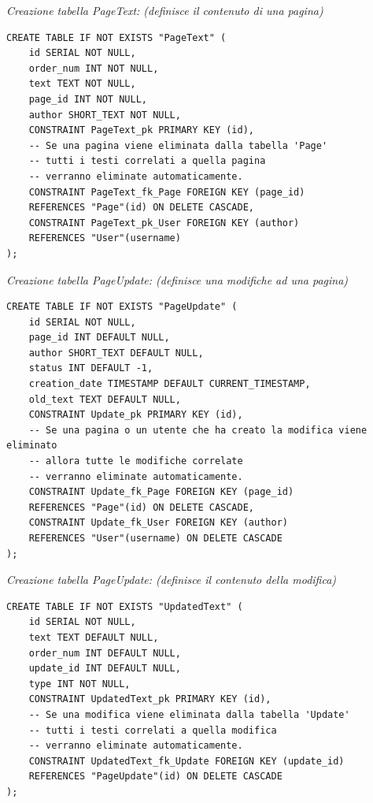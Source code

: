\documentclass{article}
\begin{document}
	\newpage
	
	\textit{Creazione tabella PageText: (definisce il contenuto di una pagina)}
	\begin{lstlisting}[style=SQL]
CREATE TABLE IF NOT EXISTS "PageText" (
	id SERIAL NOT NULL,
	order_num INT NOT NULL,
	text TEXT NOT NULL,
	page_id INT NOT NULL,
	author SHORT_TEXT NOT NULL,
	CONSTRAINT PageText_pk PRIMARY KEY (id),
   	-- Se una pagina viene eliminata dalla tabella 'Page'
   	-- tutti i testi correlati a quella pagina
   	-- verranno eliminate automaticamente.	
	CONSTRAINT PageText_fk_Page FOREIGN KEY (page_id) 
	REFERENCES "Page"(id) ON DELETE CASCADE,
	CONSTRAINT PageText_pk_User FOREIGN KEY (author)
	REFERENCES "User"(username)
);
	\end{lstlisting}
	
	
	\textit{Creazione tabella PageUpdate: (definisce una modifiche ad una pagina)}
	\begin{lstlisting}[style=SQL]
CREATE TABLE IF NOT EXISTS "PageUpdate" (
	id SERIAL NOT NULL,
	page_id INT DEFAULT NULL,
	author SHORT_TEXT DEFAULT NULL,
	status INT DEFAULT -1,
	creation_date TIMESTAMP DEFAULT CURRENT_TIMESTAMP,
	old_text TEXT DEFAULT NULL,
	CONSTRAINT Update_pk PRIMARY KEY (id),
	-- Se una pagina o un utente che ha creato la modifica viene eliminato
	-- allora tutte le modifiche correlate
	-- verranno eliminate automaticamente.	
	CONSTRAINT Update_fk_Page FOREIGN KEY (page_id)
	REFERENCES "Page"(id) ON DELETE CASCADE,
	CONSTRAINT Update_fk_User FOREIGN KEY (author)
	REFERENCES "User"(username) ON DELETE CASCADE
);
	\end{lstlisting}
	
	
	\textit{Creazione tabella PageUpdate: (definisce il contenuto della modifica)}
	\begin{lstlisting}[style=SQL]
CREATE TABLE IF NOT EXISTS "UpdatedText" (
	id SERIAL NOT NULL,
	text TEXT DEFAULT NULL,
	order_num INT DEFAULT NULL,
	update_id INT DEFAULT NULL,
	type INT NOT NULL,
	CONSTRAINT UpdatedText_pk PRIMARY KEY (id),
 	-- Se una modifica viene eliminata dalla tabella 'Update'
	-- tutti i testi correlati a quella modifica
	-- verranno eliminate automaticamente.	
	CONSTRAINT UpdatedText_fk_Update FOREIGN KEY (update_id)
	REFERENCES "PageUpdate"(id) ON DELETE CASCADE
);
	\end{lstlisting}


	\newpage
\end{document}

